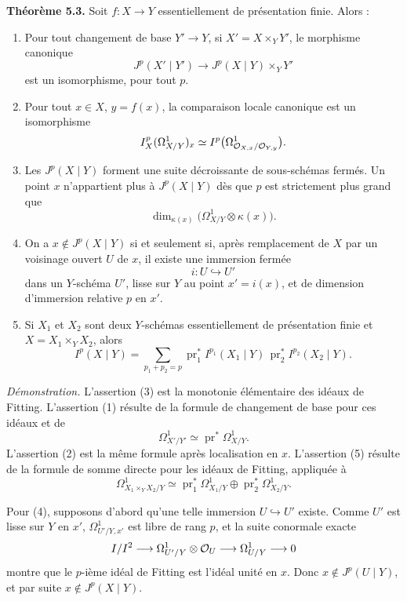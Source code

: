 \documentclass[11pt]{article}
\providecommand{\pr}{\operatorname{pr}}
\begin{document}
\textbf{Théorème 5.3.}  Soit \(f:X\to Y\) essentiellement de présentation finie.  Alors :
\begin{enumerate}[label=(\arabic*)]
\item Pour tout changement de base \(Y'\to Y\), si \(X'=X\times_Y Y'\), le morphisme canonique
\[
        J^p(X'\mid Y')\longrightarrow J^p(X\mid Y)\times_Y Y'
\]
est un isomorphisme, pour tout \(p\).
\item Pour tout \(x\in X\), \(y=f(x)\), la comparaison locale canonique est un isomorphisme
\[
        I^p_X(\Omega^1_{X/Y})_x
        \simeq
        I^p\bigl(\Omega^1_{\mathcal O_{X,x}/\mathcal O_{Y,y}}\bigr).
\]
\item Les \(J^p(X\mid Y)\) forment une suite décroissante de sous-schémas fermés.  Un point \(x\) n'appartient plus à \(J^p(X\mid Y)\) dès que \(p\) est strictement plus grand que
\[
        \dim_{\kappa(x)}\bigl(\Omega^1_{X/Y}\otimes\kappa(x)\bigr).
\]
\item On a \(x\notin J^p(X\mid Y)\) si et seulement si, après remplacement de \(X\) par un voisinage ouvert \(U\) de \(x\), il existe une immersion fermée
\[
        i:U\hookrightarrow U'
\]
dans un \(Y\)-schéma \(U'\), lisse sur \(Y\) au point \(x'=i(x)\), et de dimension d'immersion relative \(p\) en \(x'\).
\item Si \(X_1\) et \(X_2\) sont deux \(Y\)-schémas essentiellement de présentation finie et \(X=X_1\times_YX_2\), alors
\[
        I^p(X\mid Y)
        =
        \sum_{p_1+p_2=p}
        \pr_1^*I^{p_1}(X_1\mid Y)\,
        \pr_2^*I^{p_2}(X_2\mid Y).
\]
\end{enumerate}

\emph{Démonstration.}  L'assertion (3) est la monotonie élémentaire des idéaux de Fitting.  L'assertion (1) résulte de la formule de changement de base pour ces idéaux et de
\[
        \Omega^1_{X'/Y'}\simeq \pr^*\Omega^1_{X/Y}.
\]
L'assertion (2) est la même formule après localisation en \(x\).  L'assertion (5) résulte de la formule de somme directe pour les idéaux de Fitting, appliquée à
\[
        \Omega^1_{X_1\times_YX_2/Y}
        \simeq
        \pr_1^*\Omega^1_{X_1/Y}\oplus
        \pr_2^*\Omega^1_{X_2/Y}.
\]

Pour (4), supposons d'abord qu'une telle immersion \(U\hookrightarrow U'\) existe.  Comme \(U'\) est lisse sur \(Y\) en \(x'\), \(\Omega^1_{U'/Y,x'}\) est libre de rang \(p\), et la suite conormale exacte
\[
        I/I^2\longrightarrow
        \Omega^1_{U'/Y}\otimes\mathcal O_U\longrightarrow
        \Omega^1_{U/Y}\longrightarrow 0
\]
montre que le \(p\)-ième idéal de Fitting est l'idéal unité en \(x\).  Donc \(x\notin J^p(U\mid Y)\), et par suite \(x\notin J^p(X\mid Y)\).
\end{document}
